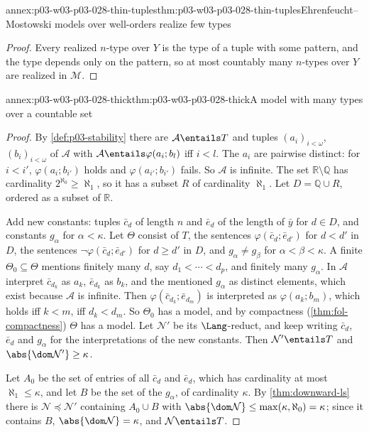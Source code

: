 \begin{annexitem}{annex:p03-w03-p03-028-thin-tuples}{thm:p03-w03-p03-028-thin-tuples}{Ehrenfeucht--Mostowski models over well-orders realize few types}
\begin{proof}
Every realized \(n\)-type over \(Y\) is the type of a tuple with some
pattern, and the type depends only on the pattern, so at most countably
many \(n\)-types over \(Y\) are realized in \(\mathcal M\).
\end{proof}
\end{annexitem}

\begin{annexitem}{annex:p03-w03-p03-028-thick}{thm:p03-w03-p03-028-thick}{A model with many types over a countable set}
\begin{proof}
By \cref{def:p03-stability} there are \(\mathcal A\entails T\) and tuples
\((a_i)_{i<\omega}\), \((b_i)_{i<\omega}\) of \(\mathcal A\) with
\(\mathcal A\entails\varphi(a_i;b_l)\) iff \(i<l\).  The \(a_i\) are
pairwise distinct: for \(i<i'\), \(\varphi(a_i;b_{i'})\) holds and
\(\varphi(a_{i'};b_{i'})\) fails.  So \(\mathcal A\) is infinite.  The set
\(\mathbb R\setminus\mathbb Q\) has cardinality \(2^{\aleph_0}\geq\aleph_1\),
so it has a subset \(R\) of cardinality \(\aleph_1\).  Let
\(D=\mathbb Q\cup R\), ordered as a subset of \(\mathbb R\).

Add new constants: tuples \(\bar c_d\) of length \(n\) and \(\bar e_d\) of
the length of \(\bar y\) for \(d\in D\), and constants \(g_\alpha\) for
\(\alpha<\kappa\).  Let \(\Theta\) consist of \(T\), the sentences
\(\varphi(\bar c_d;\bar e_{d'})\) for \(d<d'\) in \(D\), the sentences
\(\neg\varphi(\bar c_d;\bar e_{d'})\) for \(d\geq d'\) in \(D\), and
\(g_\alpha\neq g_\beta\) for \(\alpha<\beta<\kappa\).  A finite
\(\Theta_0\subseteq\Theta\) mentions finitely many \(d\), say
\(d_1<\cdots<d_p\), and finitely many \(g_\alpha\).  In \(\mathcal A\)
interpret \(\bar c_{d_k}\) as \(a_k\), \(\bar e_{d_k}\) as \(b_k\), and the
mentioned \(g_\alpha\) as distinct elements, which exist because
\(\mathcal A\) is infinite.  Then \(\varphi(\bar c_{d_k};\bar e_{d_m})\) is
interpreted as \(\varphi(a_k;b_m)\), which holds iff \(k<m\), iff
\(d_k<d_m\).  So \(\Theta_0\) has a model, and by compactness
(\cref{thm:fol-compactness}) \(\Theta\) has a model.  Let \(\mathcal N'\)
be its \(\Lang\)-reduct, and keep writing \(\bar c_d\), \(\bar e_d\) and
\(g_\alpha\) for the interpretations of the new constants.  Then
\(\mathcal N'\entails T\) and \(\abs{\dom\mathcal N'}\geq\kappa\).

Let \(A_0\) be the set of entries of all \(\bar c_d\) and \(\bar e_d\),
which has cardinality at most \(\aleph_1\leq\kappa\), and let \(B\) be the
set of the \(g_\alpha\), of cardinality \(\kappa\).  By
\cref{thm:downward-ls} there is \(\mathcal N\preccurlyeq\mathcal N'\)
containing \(A_0\cup B\) with
\(\abs{\dom\mathcal N}\leq\max(\kappa,\aleph_0)=\kappa\); since it contains
\(B\), \(\abs{\dom\mathcal N}=\kappa\), and \(\mathcal N\entails T\).


\end{proof}
\end{annexitem}
